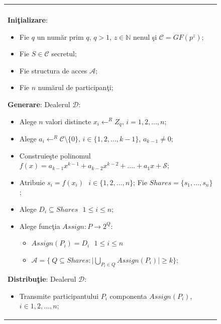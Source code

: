\documentclass{llncs}
\begin{document}
\begin{figure}[h!]

\begin{tabular}{|p{\textwidth}|}
\hline

\\
\hspace{.1in}
\textbf{Ini\c{t}ializare}: 
	\begin{itemize}
		\item Fie $q$ un num\u{a}r prim $q$, $q > 1$, $z \in \mathbb{N}$ nenul \c{s}i $\mathcal{C} = GF(p^z)$;
		\item Fie $S \in \mathcal{C}$ secretul; 
		\item Fie structura de acces $\mathcal{A}$;
		\item Fie $n$ num\u{a}rul de participan\c{t}i;
	\end{itemize}

\medskip

\hspace{.1in}
\textbf{Generare}: Dealerul $\mathcal{D}$:
	\begin{itemize}
		\setlength{\itemsep}{5pt}
		\item Alege $n$ valori distincte $x_i \leftarrow^R Z_q \text{, }i = 1,2,\dots,n$;
		\item Alege $a_{i} \leftarrow^R \mathcal{C} \setminus \{0\} \text{, }i \in \{1,2,\dots,{k - 1}\}$, $a_{k-1} \neq 0$;
		\item Construie\c{s}te polinomul $f(x) = a_{k - 1}x ^ {k-1} + a_{k-2}x ^ {k - 2} + .... + a_1x + \mathcal{S}$;
		\item Atribuie $s_i = f(x_i) \text{ } i \in \{1,2,\dots,n\}$; Fie $Shares = \{ s_1, \dots, s_n \}$;
		\item Alege $D_i \subseteq Shares \text{ } 1 \leq i \leq n$;
		\item Alege func\c{t}ia $Assign: P \rightarrow 2^Q$:
			\begin{itemize}
				\item $Assign(P_i) = D_i \text{ } 1 \leq i \leq n$
				\item $\mathcal{A} = \bigg \{ \ Q \subseteq Shares: \bigg| \underset{P_i \in Q}{{\bigcup}} Assign(P_i) \bigg| \geq k \bigg \}$;
			\end{itemize}
	\end{itemize}
\medskip

\hspace{.1in}
\textbf{Distribu\c{t}ie}: Dealerul $\mathcal{D}$:
	\begin{itemize}
		\item Transmite participantului $P_i$ componenta $Assign(P_i)$, $i \in 1,2,\dots,n$;
	\end{itemize}


\end{tabular}
\end{figure}
\end{document}
